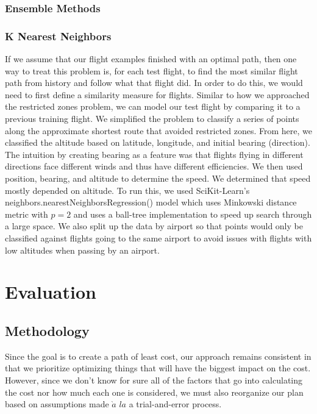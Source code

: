 \documentclass{article}[12pt]
\begin{document}
\begin{multicols}{2}
\subsubsection{Ensemble Methods}
\subsubsection{K Nearest Neighbors}

If we assume that our flight examples finished with an optimal path, then one way to treat this problem is, for each test flight, to find the most similar flight path from history and follow what that flight did. In order to do this, we would need to first define a similarity measure for flights. 
Similar to how we approached the restricted zones problem, we can model our test flight by comparing it to a previous training flight. We simplified the problem to classify a series of points along the approximate shortest route that avoided restricted zones. From here, we classified the altitude based on latitude, longitude, and initial bearing (direction). The intuition by creating bearing as a feature was that flights flying in different directions face different winds and thus have different efficiencies. We then used position, bearing, and altitude to determine the speed. We determined that speed mostly depended on altitude. To run this, we used SciKit-Learn's neighbors.nearestNeighborsRegression() model which uses Minkowski distance metric with $p=2$ and uses a ball-tree implementation to speed up search through a large space. We also split up the data by airport so that points would only be classified against flights going to the same airport to avoid issues with flights with low altitudes when passing by an airport.

\section{Evaluation}
\subsection{Methodology}
Since the goal is to create a path of least cost, our approach remains consistent in that we prioritize optimizing things that will have the biggest impact on the cost. However, since we don't know for sure all of the factors that go into calculating the cost nor how much each one is considered, we must also reorganize our plan based on assumptions made $\grave{a}$ $la$ a trial-and-error process.


\end{multicols}
\end{document}

